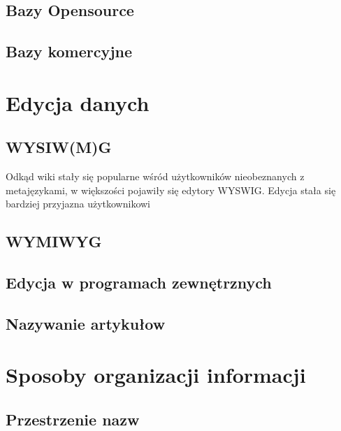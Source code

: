 \documentclass{article}
\begin{document}
	\subsection{Bazy Opensource}
	\subsection{Bazy komercyjne}

\section{Edycja danych}
	\subsection{WYSIW(M)G}
	Odkąd wiki stały się popularne wśród użytkowników nieobeznanych z metajęzykami, 
w większości pojawiły się edytory WYSWIG. Edycja stała się bardziej przyjazna użytkownikowi

	\subsection{WYMIWYG}
	\subsection{Edycja w programach zewnętrznych}
	\subsection{Nazywanie artykułow}

\section{Sposoby organizacji informacji}	
	\subsection{Przestrzenie nazw}
\end{document}
